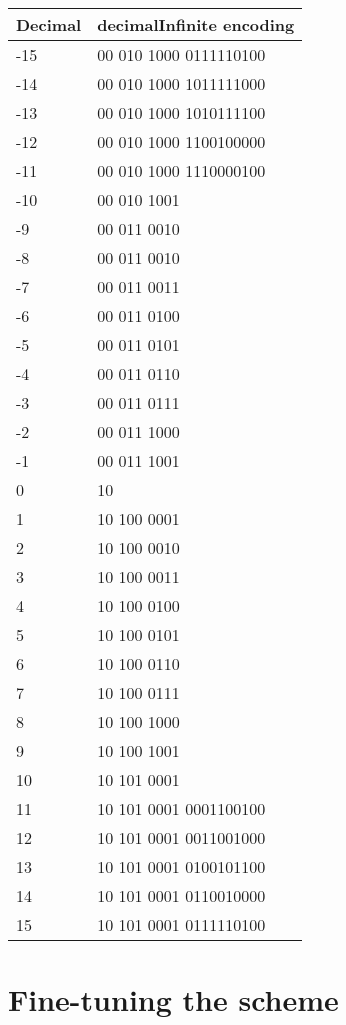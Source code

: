 \documentclass[final,leqno,onefignum,onetabnum]{siamltex1213}
\begin{document}
\begin{tabular}{|l|l|}
\hline
Decimal & decimalInfinite encoding \\
\hline
-15 & 00 010 1000 0111110100\\
\hline
-14 & 00 010 1000 1011111000\\
\hline
-13 & 00 010 1000 1010111100\\
\hline
-12 & 00 010 1000 1100100000\\
\hline
-11 & 00 010 1000 1110000100\\
\hline
-10 & 00 010 1001\\
\hline
-9 & 00 011 0010\\
\hline
-8 & 00 011 0010\\
\hline
-7 & 00 011 0011\\
\hline
-6 & 00 011 0100\\
\hline
-5 & 00 011 0101\\
\hline
-4 & 00 011 0110\\
\hline
-3 & 00 011 0111\\
\hline
-2 & 00 011 1000\\
\hline
-1 & 00 011 1001\\
\hline
0 & 10 \\
\hline
1 & 10 100 0001\\
\hline
2 & 10 100 0010\\
\hline
3 & 10 100 0011\\
\hline
4 & 10 100 0100\\
\hline
5 & 10 100 0101\\
\hline
6 & 10 100 0110\\
\hline
7 & 10 100 0111\\
\hline
8 & 10 100 1000\\
\hline
9 & 10 100 1001\\
\hline
10 & 10 101 0001\\
\hline
11 & 10 101 0001 0001100100\\
\hline
12 & 10 101 0001 0011001000\\
\hline
13 & 10 101 0001 0100101100\\
\hline
14 & 10 101 0001 0110010000\\
\hline
15 & 10 101 0001 0111110100\\
\hline
\hline
\end{tabular}



\section{Fine-tuning the scheme}
\label{section-fine-tune}
\end{document}
